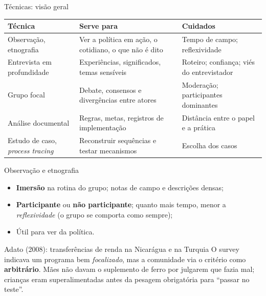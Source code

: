 \begin{frame}{Técnicas: visão geral}
  \scriptsize
  \renewcommand{\arraystretch}{1.3}
  \begin{tabularx}{\textwidth}{@{}>{\raggedright\arraybackslash}p{2.3cm}>{\raggedright\arraybackslash}X>{\raggedright\arraybackslash}X@{}}
    \toprule
    \textbf{Técnica} & \textbf{Serve para} & \textbf{Cuidados} \\ \midrule
    Observação, etnografia & Ver a política em ação, o cotidiano, o que não é dito & Tempo de campo; reflexividade \\
    Entrevista em profundidade & Experiências, significados, temas sensíveis & Roteiro; confiança; viés do entrevistador \\
    Grupo focal & Debate, consensos e divergências entre atores & Moderação; participantes dominantes \\
    Análise documental & Regras, metas, registros de implementação & Distância entre o papel e a prática \\
    Estudo de caso, \emph{process tracing} & Reconstruir sequências e testar mecanismos & Escolha dos casos \\ \bottomrule
  \end{tabularx}
\end{frame}

\begin{frame}{Observação e etnografia}
  \begin{itemize}
    \item \textbf{Imersão} na rotina do grupo; notas de campo e descrições densas;
    \item \textbf{Participante} ou \textbf{não participante}; quanto mais tempo, menor a \emph{reflexividade} (o grupo se comporta como sempre);
    \item Útil para ver  da política.
  \end{itemize}
  \vspace{0.2cm}
  \begin{block}{Adato (2008): transferências de renda na Nicarágua e na Turquia}
    \scriptsize
    O survey indicava um programa bem \emph{focalizado}, mas a comunidade via o critério como \textbf{arbitrário}. Mães não davam o suplemento de ferro por julgarem que fazia mal; crianças eram superalimentadas antes da pesagem obrigatória para ``passar no teste''.
  \end{block}
\end{frame}

